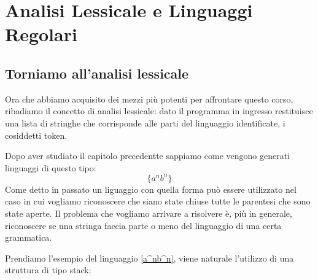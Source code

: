 \documentclass[class=book, crop=false, oneside, 12pt]{standalone}
\begin{document}
\chapter{Analisi Lessicale e Linguaggi Regolari}


\section{Torniamo all'analisi lessicale}

Ora che abbiamo acquisito dei mezzi più potenti per affrontare questo corso, ribadiamo il concetto di analisi lessicale: dato il programma in ingresso restituisce una lista di stringhe che corrisponde alle parti del linguaggio identificate, i cosiddetti token.

Dopo aver studiato il capitolo precedentte sappiamo come vengono generati linguaggi di questo tipo:
\begin{equation}
    \label{a^nb^n}
    \{a^n b^n\}    
\end{equation}
Come detto in passato un liguaggio con quella forma può essere utilizzato nel caso in cui vogliamo riconoscere che siano state chiuse tutte le parentesi che sono state aperte.
Il problema che vogliamo arrivare a risolvere è, più in generale, riconoscere se una stringa faccia parte o meno del linguaggio di una certa grammatica.

Prendiamo l’esempio del linguaggio \ref{a^nb^n}, viene naturale l'utilizzo di una struttura di tipo stack:\\
\end{document}
